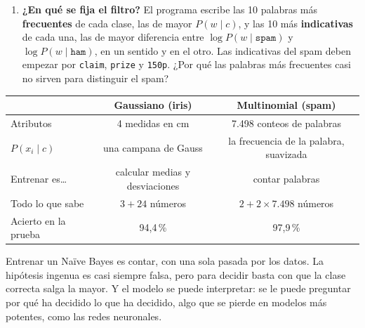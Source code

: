 \documentclass{article}
\begin{document}
\begin{exercise}[breakable]
\begin{enumerate}
    \item[c)] \textbf{¿En qué se fija el filtro?} El programa escribe las 10 palabras más \textbf{frecuentes} de cada clase, las de mayor $P(w \mid c)$, y las 10 más \textbf{indicativas} de cada una, las de mayor diferencia entre $\log P(w \mid \texttt{spam})$ y $\log P(w \mid \texttt{ham})$, en un sentido y en el otro. Las indicativas del spam deben empezar por \texttt{claim}, \texttt{prize} y \texttt{150p}. ¿Por qué las palabras más frecuentes casi no sirven para distinguir el spam?
\end{enumerate}
\end{exercise}


\begin{idea}[title=\textbf{Para terminar}]
\centering
\small
\begin{tabular}{lcc}
\toprule
 & Gaussiano (iris) & Multinomial (spam) \\
\midrule
Atributos & 4 medidas en cm & 7.498 conteos de palabras \\
$P(x_i \mid c)$ & una campana de Gauss & la frecuencia de la palabra, suavizada \\
Entrenar es\dots & calcular medias y desviaciones & contar palabras \\
Todo lo que sabe & $3 + 24$ números & $2 + 2 \times 7.498$ números \\
Acierto en la prueba & 94,4\,\% & 97,9\,\% \\
\bottomrule
\end{tabular}

\raggedright
\medskip
Entrenar un Naïve Bayes es contar, con una sola pasada por los datos. La hipótesis ingenua es casi siempre falsa, pero para decidir basta con que la clase correcta salga la mayor. Y el modelo se puede interpretar: se le puede preguntar por qué ha decidido lo que ha decidido, algo que se pierde en modelos más potentes, como las redes neuronales.
\end{idea}
\end{document}
